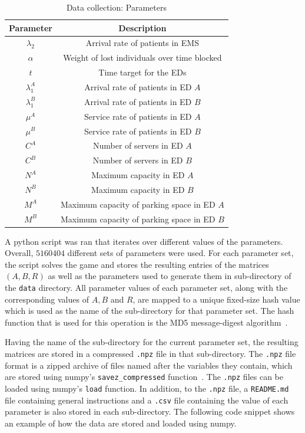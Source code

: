 \begin{table}[H]
    \centering
    \caption{Data collection: Parameters}
    \begin{tabular}{|c|c|}
        \hline
        Parameter & Description \\
        \hline
        \(\lambda_2\) & Arrival rate of patients in EMS \\
        \(\alpha\) & Weight of lost individuals over time blocked \\
        \(t\) & Time target for the EDs \\
        \(\lambda_1^A\) & Arrival rate of patients in ED \(A\) \\
        \(\lambda_1^B\) & Arrival rate of patients in ED \(B\) \\
        \(\mu^A\) & Service rate of patients in ED \(A\) \\
        \(\mu^B\) & Service rate of patients in ED \(B\) \\
        \(C^A\) & Number of servers in ED \(A\) \\
        \(C^B\) & Number of servers in ED \(B\) \\
        \(N^A\) & Maximum capacity in ED \(A\) \\
        \(N^B\) & Maximum capacity in ED \(B\) \\
        \(M^A\) & Maximum capacity of parking space in ED \(A\) \\
        \(M^B\) & Maximum capacity of parking space in ED \(B\) \\
        \hline
    \end{tabular}
    \label{tab:data_collection_parameters}
\end{table}

A python script was ran that iterates over different values of the parameters.
Overall, \(5160404\) different sets of parameters were used.
For each parameter set, the script solves the game and stores the resulting
entries of the matrices \((A, B, R)\) as well as the parameters used to generate
them in sub-directory of the \lstinline{data} directory.
All parameter values of each parameter set, along with the corresponding values
of \(A, B\) and \(R\), are mapped to a unique fixed-size hash value which is
used as the name of the sub-directory for that parameter set.
The hash function that is used for this operation is the MD5 message-digest
algorithm~\cite{rivest1992md5}.

Having the name of the sub-directory for the current parameter set, the
resulting matrices are stored in a compressed \lstinline{.npz} file in that
sub-directory.
The \lstinline{.npz} file format is a zipped archive of files
named after the variables they contain, which are stored using numpy's
\lstinline[style=pystyle]{savez_compressed} function~\cite{2020NumPy-Array}.
The \lstinline{.npz} files can be loaded using numpy's
\lstinline[style=pystyle]{load} function.
In addition, to the \lstinline{.npz} file, a
\lstinline{README.md} file containing general instructions and a
\lstinline{.csv} file containing the value of each parameter is
also stored in each sub-directory.
The following code snippet shows an example of how the data are stored and
loaded using numpy.

